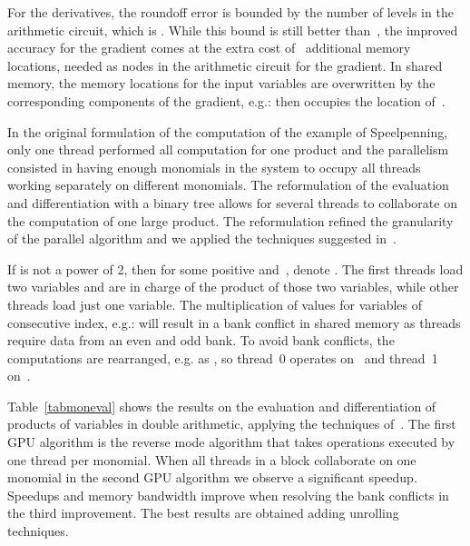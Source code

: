 \documentclass{article}
\begin{document}
For the derivatives, the roundoff error is bounded by the number
of levels in the arithmetic circuit, which is
\newline .
While this bound is still better than~,
the improved accuracy for the gradient comes at the extra cost
of~ additional memory locations, needed as nodes in the arithmetic
circuit for the gradient.
In shared memory, the memory locations for the input variables 
are overwritten by the corresponding components of the gradient,
e.g.:  
then occupies the location of~. 

In the original formulation of the computation of the example
of Speelpenning, only one thread performed all computation for
one product and the parallelism consisted in having enough
monomials in the system to occupy all threads working separately
on different monomials.  The reformulation of the evaluation
and differentiation with a binary tree allows for several threads
to collaborate on the computation of one large product.
The reformulation refined the granularity of the parallel algorithm
and we applied the techniques suggested in~\cite{Harris}.

If  is not a power of 2, then for some positive  and~,
denote .
The first  threads load two variables and are in charge of
the product of those two variables, while other threads load
just one variable.  
The multiplication of values for variables of consecutive index,
e.g.:  will result in a bank conflict in shared memory
as threads require data from an even and odd bank.
To avoid bank conflicts, the computations are rearranged,
e.g. as ,
so thread~0 operates on~ and thread~1 on~.

Table~\ref{tabmoneval} shows the results on the evaluation
and differentiation of products of variables in double arithmetic,
applying the techniques of~\cite{Harris}.
The first GPU algorithm is the reverse mode algorithm that takes
 operations executed by one thread per monomial.
When all threads in a block collaborate on one monomial
in the second GPU algorithm we observe a significant speedup.
Speedups and memory bandwidth improve when resolving the
bank conflicts in the third improvement.
The best results are obtained adding unrolling techniques.
\end{document}
